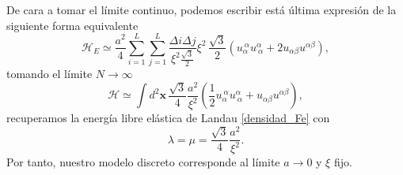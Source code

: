 De cara a tomar el límite continuo, podemos escribir está última expresión de
la siguiente forma equivalente 
\begin{equation*}
\mathcal{H}_E\simeq\frac{a^2}{4}\sum_{i=1}^L\sum_{j=1}^L\frac{\Delta i\Delta j}{\xi^2\frac{\sqrt{3}}{2}}\xi^2\,\frac{\sqrt{3}}{2}(u_{\alpha}^{\ \alpha}u^{\alpha}_{\ \alpha}+2u_{\alpha\beta}u^{\alpha\beta}),
\end{equation*}
tomando el límite $N\rightarrow \infty$
\begin{equation*}
\mathcal{H}\simeq\int d^2\mathbf{x}\, \frac{\sqrt{3}}{4}\frac{a^2}{\xi^2}\left(\frac{1}{2}u_{\alpha}^{\ \alpha}u^{\alpha}_{\ \alpha}+u_{\alpha\beta}u^{\alpha\beta}\right),
\end{equation*}
recuperamos la energía libre elástica de Landau \eqref{densidad_Fe} con 
\begin{equation*}
\lambda=\mu=\frac{\sqrt{3}}{4}\frac{a^2}{\xi^2}.
\end{equation*}
Por tanto, nuestro modelo discreto corresponde al límite $a\rightarrow 0$ y $\xi$ fijo.

